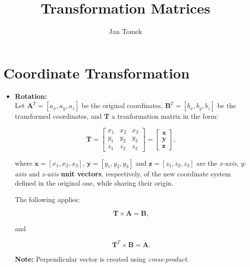 \documentclass[10pt,b5paper,titlepage]{book}
\author{Jan Tomek}
\title{\bf Transformation Matrices}
\begin{document}
\maketitle

\tableofcontents

\chapter{Coordinate Transformation}

\begin{itemize}
    \item \textbf{Rotation:} \\

        Let $\mathbf{A}^{T} = [a_{x}, a_{y}, a_{z}]$ be the original coordinates,
        $\mathbf{B}^{T} = [b_{x}, b_{y}, b_{z}]$ be the transformed coordinates, and
        $\mathbf{T}$ a tranformation matrix in the form:

        \begin{equation}
            \mathbf{T} = \begin{bmatrix}
                x_1 & x_2 & x_3 \\
                y_1 & y_2 & y_3 \\
                z_1 & z_2 & z_3
            \end{bmatrix} = \begin{bmatrix}
                \mathbf{x} \\
                \mathbf{y} \\
                \mathbf{z}
            \end{bmatrix}
        ,\end{equation}

        where $\mathbf{x} = [x_1, x_2, x_3]$, $\mathbf{y} = [y_1, y_2, y_3]$ and
        $\mathbf{z} = [z_1, z_2, z_3]$ are the \textit{x-axis}, \textit{y-axis} and
        \textit{z-axis} \textbf{unit vectors}, respectively, of the new coordinate
        system defined in the original one, while sharing their origin.

        The following applies:

        \begin{equation}
            \mathbf{T} \times \mathbf{A} = \mathbf{B}
        ,\end{equation}

        and

        \begin{equation}
            \mathbf{T}^{T} \times \mathbf{B} = \mathbf{A}
        .\end{equation}

        \textbf{Note:} Perpendicular vector is  created using \textit{cross-product}.
\end{itemize}
\end{document}
